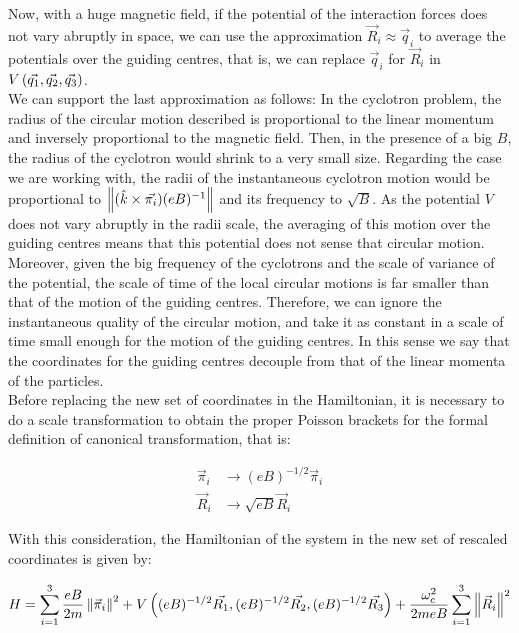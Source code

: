 Now, with a huge magnetic field, if the potential of the interaction forces does not vary abruptly in space, we can use the approximation $\vec{R}_i \approx \vec{q}_i$ to average the potentials over the guiding centres, that is, we can replace $\vec{q}_i$ for $\vec{R}_i$ in  $V \left(  \vec{q_1},\vec{q_2},\vec{q_3}  \right)$.\\

We can support the last approximation as follows: In the cyclotron problem, the radius of the circular motion described is proportional to the linear momentum and inversely proportional to the magnetic field. Then, in the presence of a big $B$, the radius of the cyclotron would shrink to a very small size. Regarding the case we are working with, the radii of the instantaneous cyclotron motion would be proportional to $\left\lVert (\hat{k} \times \vec{\pi_i})(eB)^{-1} \right\rVert$ and its frequency to $\sqrt{B}$. As the potential $V$ does not vary abruptly in the radii scale, the averaging of this motion over the guiding centres means that this potential does not sense that circular motion. Moreover, given the big frequency of the cyclotrons and the scale of variance of the potential, the scale of time of the local circular motions is far smaller than that of the motion of the guiding centres. Therefore, we can ignore the instantaneous quality of the circular motion, and take it as constant in a scale of time small enough for the motion of the guiding centres. In this sense we say that the coordinates for the guiding centres decouple from that of the linear momenta of the particles.\\

Before replacing the new set of coordinates in the Hamiltonian, it is necessary to do a scale transformation to obtain the proper Poisson brackets for the formal definition of canonical transformation, that is:

\begin{align*}
\vec{\pi}_i & \rightarrow (eB)^{-1/2} \vec{ \pi}_i\\
\vec{R}_i & \rightarrow \sqrt{eB} \vec{R}_i
\end{align*}

With this consideration, the Hamiltonian of the system in the new set of rescaled coordinates is given by:

\begin{equation}
H = \sum_{i=1}^{3} \frac{eB}{2m} \left\lVert  \vec{\pi}_i \right\rVert^2
+ V\left(  (eB)^{-1/2}\vec{R_1},(eB)^{-1/2}\vec{R_2}, (eB)^{-1/2}\vec{R_3}  \right)
+\frac{\omega_c^2}{2meB}\sum_{i=1}^{3} \left\lVert \vec{R}_i \right\rVert^2
\label{eq:newham}
\end{equation}

